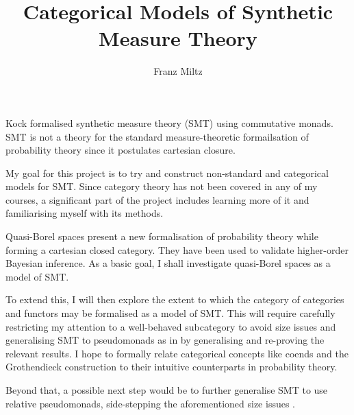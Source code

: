 \documentclass{article}
\begin{document}
\title{Categorical Models of Synthetic Measure Theory}
\author{Franz Miltz}
\maketitle

Kock formalised synthetic measure theory (SMT) using commutative monads. \cite{kock2011commutative}
SMT is not a theory for the standard measure-theoretic formailsation of probability theory since it 
postulates cartesian closure.

My goal for this project is to try and construct non-standard and categorical models for SMT. 
Since category theory has not been covered in any of my courses, a significant part of the project 
includes learning more of it and familiarising myself with its methods.

Quasi-Borel spaces present a new formalisation of probability theory while forming a cartesian 
closed category. \cite{DBLP:journals/corr/HeunenKSY17} 
They have been used to validate higher-order Bayesian inference. \cite{DBLP:journals/corr/abs-1711-03219}
As a basic goal, I shall investigate quasi-Borel spaces as a model of SMT.

To extend this, I will then explore the extent to which the category of categories and functors may
be formalised as a model of SMT. 
This will require carefully restricting my attention to a well-behaved subcategory to avoid size 
issues and generalising SMT to pseudomonads as in \cite{Marmolejo_no-iterationpseudomonads} by 
generalising and re-proving the relevant results. 
I hope to formally relate categorical concepts like coends and the Grothendieck construction to 
their intuitive counterparts in probability theory. 

Beyond that, a possible next step would be to further generalise SMT to use relative pseudomonads,
side-stepping the aforementioned size issues \cite{Fiore_relative-pseudomonads2017}.

{}

\end{document}
